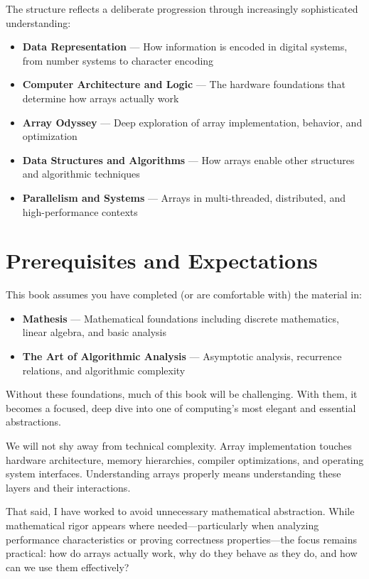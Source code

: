 The structure reflects a deliberate progression through increasingly sophisticated understanding:

\begin{itemize}
	\item \textbf{Data Representation} — How information is encoded in digital systems, from number systems to character encoding
	\item \textbf{Computer Architecture and Logic} — The hardware foundations that determine how arrays actually work
	\item \textbf{Array Odyssey} — Deep exploration of array implementation, behavior, and optimization
	\item \textbf{Data Structures and Algorithms} — How arrays enable other structures and algorithmic techniques
	\item \textbf{Parallelism and Systems} — Arrays in multi-threaded, distributed, and high-performance contexts
\end{itemize}

\section*{Prerequisites and Expectations}

This book assumes you have completed (or are comfortable with) the material in:

\begin{itemize}
	\item \textbf{Mathesis} — Mathematical foundations including discrete mathematics, linear algebra, and basic analysis
	\item \textbf{The Art of Algorithmic Analysis} — Asymptotic analysis, recurrence relations, and algorithmic complexity
\end{itemize}

Without these foundations, much of this book will be challenging. With them, it becomes a focused, deep dive into one of computing's most elegant and essential abstractions.

We will not shy away from technical complexity. Array implementation touches hardware architecture, memory hierarchies, compiler optimizations, and operating system interfaces. Understanding arrays properly means understanding these layers and their interactions.

That said, I have worked to avoid unnecessary mathematical abstraction. While mathematical rigor appears where needed—particularly when analyzing performance characteristics or proving correctness properties—the focus remains practical: how do arrays actually work, why do they behave as they do, and how can we use them effectively?

